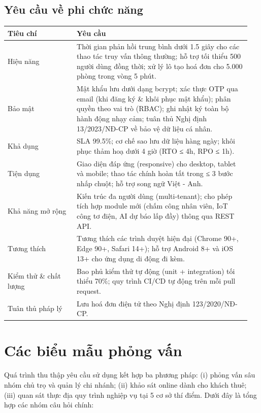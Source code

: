 \documentclass[a4paper,oneside]{report}
\begin{document}
\subsection{Yêu cầu về phi chức năng}

\begin{longtable}[]{@{}>{\RaggedRight\arraybackslash}p{0.27\linewidth}>{\RaggedRight\arraybackslash}p{0.68\linewidth}@{}}
\toprule
\textbf{Tiêu chí} & \textbf{Yêu cầu}\tabularnewline
\midrule
\endhead
Hiệu năng & Thời gian phản hồi trung bình dưới 1.5 giây cho các thao tác
truy vấn thông thường; hỗ trợ tối thiểu 500 người dùng đồng thời; xử lý
lô tạo hoá đơn cho 5.000 phòng trong vòng 5 phút.\tabularnewline
Bảo mật & Mật khẩu lưu dưới dạng bcrypt; xác thực OTP qua email (khi
đăng ký \& khôi phục mật khẩu); phân quyền theo vai trò (RBAC); ghi nhật
ký toàn bộ hành động nhạy cảm; tuân thủ Nghị định 13/2023/NĐ-CP về bảo
vệ dữ liệu cá nhân.\tabularnewline
Khả dụng & SLA 99.5\%; cơ chế sao lưu dữ liệu hàng ngày; khôi phục thảm
hoạ dưới 4 giờ (RTO ≤ 4h, RPO ≤ 1h).\tabularnewline
Tiện dụng & Giao diện đáp ứng (responsive) cho desktop, tablet và
mobile; thao tác chính hoàn tất trong ≤ 3 bước nhấp chuột; hỗ trợ song
ngữ Việt - Anh.\tabularnewline
Khả năng mở rộng & Kiến trúc đa người dùng (multi-tenant); cho phép tích
hợp module mới (chấm công nhân viên, IoT công tơ điện, AI dự báo lấp
đầy) thông qua REST API.\tabularnewline
Tương thích & Tương thích các trình duyệt hiện đại (Chrome 90+, Edge
90+, Safari 14+); hỗ trợ Android 8+ và iOS 13+ cho ứng dụng di động đi
kèm.\tabularnewline
Kiểm thử \& chất lượng & Bao phủ kiểm thử tự động (unit + integration)
tối thiểu 70\%; quy trình CI/CD tự động trên mỗi pull
request.\tabularnewline
Tuân thủ pháp lý & Lưu hoá đơn điện tử theo Nghị định
123/2020/NĐ-CP.\tabularnewline
\bottomrule
\end{longtable}

\section{Các biểu mẫu phỏng vấn}

Quá trình thu thập yêu cầu sử dụng kết hợp ba phương pháp: (i) phỏng vấn
sâu nhóm chủ trọ và quản lý chi nhánh; (ii) khảo sát online dành cho
khách thuê; (iii) quan sát thực địa quy trình nghiệp vụ tại 5 cơ sở thí
điểm. Dưới đây là tổng hợp các nhóm câu hỏi chính:
\end{document}
